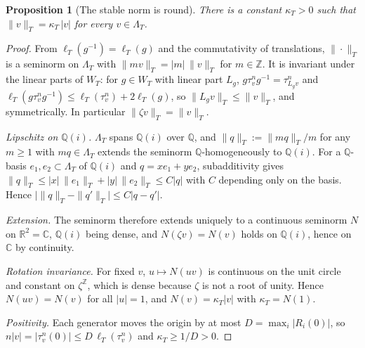 \documentclass[11pt]{article}
\theoremstyle{plain}
\newtheorem{proposition}[theorem]{Proposition}
\theoremstyle{definition}
\theoremstyle{remark}
\newcommand{\Z}{\mathbb{Z}}
\newcommand{\Q}{\mathbb{Q}}
\newcommand{\R}{\mathbb{R}}
\newcommand{\C}{\mathbb{C}}
\begin{document}
\begin{proposition}[The stable norm is round]
\label{prop:round-norm}
There is a constant $\kappa_T>0$ such that $\|v\|_T=\kappa_T\,|v|$ for every
$v\in\Lambda_T$.
\end{proposition}

\begin{proof}
From $\ell_T(g^{-1})=\ell_T(g)$ and the commutativity of translations,
$\|\cdot\|_T$ is a seminorm on $\Lambda_T$ with $\|mv\|_T=|m|\,\|v\|_T$ for
$m\in\Z$. It is invariant under the linear parts of $W_T$: for $g\in W_T$ with
linear part $L_g$, $g\tau_v^ng^{-1}=\tau_{L_gv}^n$ and
$\ell_T(g\tau_v^ng^{-1})\le\ell_T(\tau_v^n)+2\ell_T(g)$, so
$\|L_gv\|_T\le\|v\|_T$, and symmetrically. In particular $\|\zeta v\|_T=\|v\|_T$.

\emph{Lipschitz on $\Q(i)$.} $\Lambda_T$ spans $\Q(i)$ over $\Q$, and
$\|q\|_T:=\|mq\|_T/m$ for any $m\ge1$ with $mq\in\Lambda_T$ extends the
seminorm $\Q$-homogeneously to $\Q(i)$. For a $\Q$-basis $e_1,e_2\subset\Lambda_T$
of $\Q(i)$ and $q=xe_1+ye_2$, subadditivity gives
$\|q\|_T\le|x|\,\|e_1\|_T+|y|\,\|e_2\|_T\le C|q|$ with $C$ depending only on the
basis. Hence $\bigl|\|q\|_T-\|q'\|_T\bigr|\le C|q-q'|$.

\emph{Extension.} The seminorm therefore extends uniquely to a continuous
seminorm $N$ on $\R^2=\C$, $\Q(i)$ being dense, and $N(\zeta v)=N(v)$ holds on
$\Q(i)$, hence on $\C$ by continuity.

\emph{Rotation invariance.} For fixed $v$, $u\mapsto N(uv)$ is continuous on the
unit circle and constant on $\zeta^{\Z}$, which is dense because $\zeta$ is not a
root of unity. Hence $N(uv)=N(v)$ for all $|u|=1$, and $N(v)=\kappa_T|v|$ with
$\kappa_T=N(1)$.

\emph{Positivity.} Each generator moves the origin by at most
$D=\max_i|R_i(0)|$, so $n|v|=|\tau_v^n(0)|\le D\,\ell_T(\tau_v^n)$ and
$\kappa_T\ge1/D>0$.
\end{proof}
\end{document}
